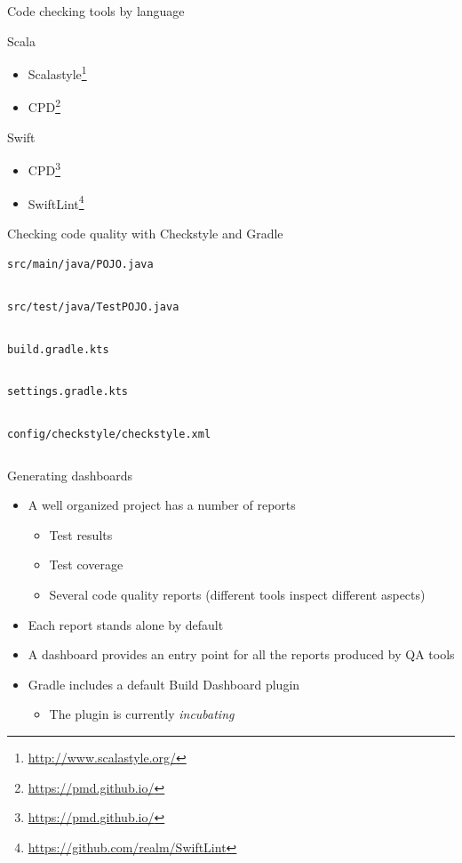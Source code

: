 \documentclass[presentation]{beamer}
\newcommand{\codefile}[4]{
	\begin{block}{\texttt{#2}}
		\inputminted[fontsize=#3,linenos=true,breaklines=true]{#4}{"workspace/#1/#2"}
	\end{block}
}
\newcommand{\java}[3]{\codefile{#1}{#2}{#3}{java}}
\newcommand{\kotlin}[3]{\codefile{#1}{#2}{#3}{kotlin}}
\newcommand{\tinier}{\fontsize{4pt}{5pt}\selectfont}
\newcommand{\fnurl}[1]{\footnote{\url{#1}}}
\begin{document}
\begin{frame}{Code checking tools by language}
    \begin{block}{Scala}
        \begin{itemize}
            \item Scalastyle\fnurl{http://www.scalastyle.org/}
            \item CPD\fnurl{https://pmd.github.io/}
        \end{itemize}
    \end{block}
    \begin{block}{Swift}
        \begin{itemize}
            \item CPD\fnurl{https://pmd.github.io/}
            \item SwiftLint\fnurl{https://github.com/realm/SwiftLint}
        \end{itemize}
    \end{block}
\end{frame}

\begin{frame}{Checking code quality with Checkstyle and Gradle}
    \java{20-Checkstyle}{src/main/java/POJO.java}{\tinier}
    \java{20-Checkstyle}{src/test/java/TestPOJO.java}{\tinier}
    \kotlin{20-Checkstyle}{build.gradle.kts}{\scriptsize}
    \kotlin{20-Checkstyle}{settings.gradle.kts}{\normalsize}
    \begin{block}{\texttt{config/checkstyle/checkstyle.xml}}
        \inputminted[fontsize=\tiny,linenos=true,breaklines=true,firstline=1,lastline=25]{xml}{workspace/20-Checkstyle/config/checkstyle/checkstyle.xml}
    \end{block}
\end{frame}

\begin{frame}[fragile]{Generating dashboards}
    \begin{itemize}
        \item A well organized project has a number of reports
        \begin{itemize}
            \item Test results
            \item Test coverage
            \item Several code quality reports (different tools inspect different aspects)
        \end{itemize}
        \item Each report stands alone by default
        \item A dashboard provides an entry point for all the reports produced by QA tools
        \item Gradle includes a default Build Dashboard plugin
        \begin{itemize}
            \item The plugin is currently \textit{incubating}
        \end{itemize}
    \end{itemize}
\end{frame}
\end{document}
